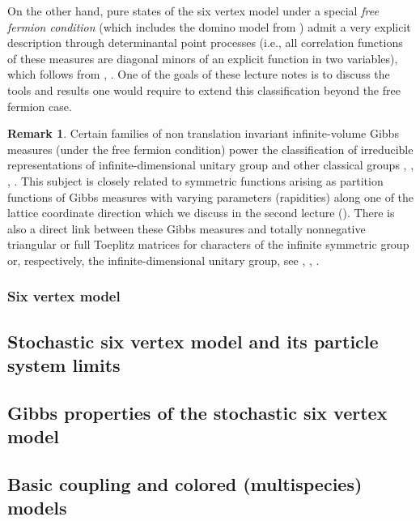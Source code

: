 \documentclass[letterpaper,11pt,oneside,reqno]{article}
\numberwithin{equation}{section}
\theoremstyle{definition}
\newtheorem{remark}[proposition]{Remark}
\begin{document}
On the other hand, pure states of the six vertex model 
under a special
\emph{free fermion condition}
(which includes the domino model from )
admit a very explicit description through
determinantal point processes 
(i.e., all correlation functions
of these measures are diagonal minors
of an explicit function in two variables),
which follows from
\cite{Sheffield2008}, 
\cite{KOS2006}.
One of the goals of these lecture notes is to discuss 
the tools and results one would require to extend this classification
beyond the free fermion case.


\begin{remark}
	\label{rmk:inf_Gibbs}
	Certain families of 
	non translation invariant
	infinite-volume
	Gibbs measures (under the free fermion condition)
	power the
	classification of irreducible representations of
	infinite-dimensional unitary group
	and other classical groups
	\cite{Voiculescu1976},
	\cite{VK82CharactersU},
	\cite{BorodinOlsh2011GT},
	\cite{Petrov2012GT}.
	This subject is closely related to symmetric
	functions arising as partition functions
	of Gibbs measures with 
	varying parameters (rapidities)
	along one of the lattice coordinate
	direction which we discuss in the second lecture ().
	There is also a direct link between these Gibbs measures and totally nonnegative triangular or
	full Toeplitz matrices for characters of the infinite
	symmetric group or, respectively, the
	infinite-dimensional unitary group, see \cite{AESW51},
	\cite{Edrei53}, \cite{Boyer1983}.
\end{remark}



\subsubsection{Six vertex model}
\label{subsub:6v_model}

\subsection{Stochastic six vertex model and its particle system limits}
\label{sub:s6v_and_degenerations}



\subsection{Gibbs properties of the stochastic six vertex model}
\label{sub:Gibbs_s6v}


\subsection{Basic coupling and colored (multispecies) models}
\label{sub:colored}
\end{document}
